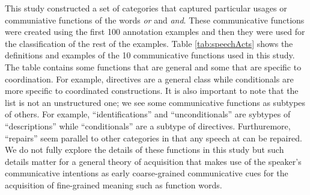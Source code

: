 \documentclass[oneside]{report}
\theoremstyle{definition}
\theoremstyle{definition}
\theoremstyle{definition}
\theoremstyle{remark}
\begin{document}
This study constructed a set of categories that captured particular
usages or communiative functions of the words \emph{or} and \emph{and}.
These communicative functions were created using the first 100
annotation examples and then they were used for the classification of
the rest of the examples. Table \ref{tab:speechActs} shows the
definitions and examples of the 10 communicative functions used in this
study. The table contains some functions that are general and some that
are specific to coordination. For example, directives are a general
class while conditionals are more specific to coordinated constructions.
It is also important to note that the list is not an unstructured one;
we see some communicative functions as subtypes of others. For example,
``identifications'' and ``unconditionals'' are sybtypes of
``descriptions'' while ``conditionals'' are a subtype of directives.
Furthuremore, ``repairs'' seem parallel to other categories in that any
speech at can be repaired. We do not fully explore the details of these
functions in this study but such details matter for a general theory of
acquisition that makes use of the speaker's communicative intentions as
early coarse-grained communicative cues for the acquisition of
fine-grained meaning such as function words.
\end{document}
